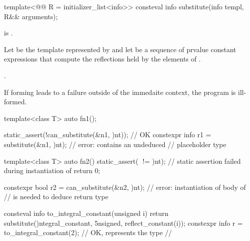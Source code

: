 %
\begin{itemdecl}
template<@@ R = initializer_list<info>>
  consteval info substitute(info templ, R&& arguments);
\end{itemdecl}

\begin{itemdescr}
\pnum
\constantwhen
{} is .

\pnum
Let  be the template represented by 
and let  be a sequence of prvalue constant expressions
that compute the reflections held by the elements of .

\pnum
\returns
{}.

\pnum
\begin{note}
If forming  leads to a failure outside of the immedaite context,
the program is ill-formed.
\end{note}

\pnum
\begin{example}
\begin{codeblock}
template<class T>
  auto fn1();

static_assert(!can_substitute(^^fn1, {^^int}));         // OK
constexpr info r1 = substitute(^^fn1, {^^int});         // error:  contains an undeduced
                                                        // placeholder type

template<class T>
  auto fn2() {
    static_assert(^^T != ^^int);    // static assertion failed during instantiation of 
    return 0;
  }

constexpr bool r2 = can_substitute(^^fn2, {^^int});     // error: instantiation of body of 
                                                        // is needed to deduce return type
\end{codeblock}
\end{example}

\pnum
\begin{example}
\begin{codeblock}
consteval info to_integral_constant(unsigned i) {
  return substitute(^^integral_constant, {^^unsigned, reflect_constant(i)});
}
constexpr info r = to_integral_constant(2);     // OK,  represents the type
                                                // 
\end{codeblock}
\end{example}
\end{itemdescr}

